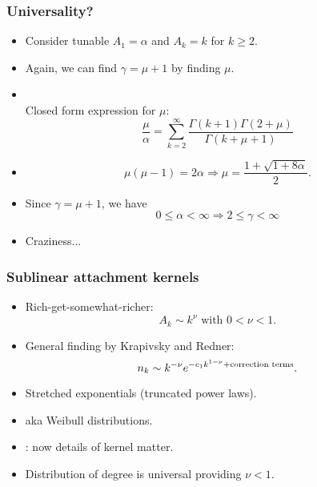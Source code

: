 \begin{frame}
  \frametitle{Universality?}

  \begin{block}{}
    \begin{itemize}
    \item<+->
      Consider tunable $A_{1} = \alpha$ and $A_{k} = k$ for $k \ge 2$.
    \item<+-> 
      Again, we can find $\gamma = \mu + 1$ by finding $\mu$.
    \item<+->
      \\
      Closed form expression for $\mu$: 
      $$
      \frac{\mu}{\alpha}
      =
      \sum_{k=2}^{\infty} 
      \frac{\Gamma(k+1)\Gamma(2+\mu)}{\Gamma(k+\mu+1)}
      $$
    \item<+->
      $$
      \mu(\mu-1) = 2\alpha \Rightarrow \mu = \frac{1+\sqrt{1+8\alpha}}{2}.
      $$
    \item<+-> 
      Since $\gamma = \mu+1$, we have
      $$
      0 \le \alpha < \infty \Rightarrow 2 \le \gamma < \infty
      $$
    \item<+-> 
      Craziness...    
    \end{itemize}
  \end{block}

\end{frame}


\begin{frame}
  \frametitle{Sublinear attachment kernels}

  \begin{block}{}
  \begin{itemize}
  \item<1-> 
    Rich-get-somewhat-richer:
    $$
    A_k \sim k^\nu
    \mbox{\ with $0 < \nu < 1$.}
    $$
  \item<2->
    General finding by Krapivsky and Redner:\cite{krapivsky2001a}
    $$
    n_k 
    \sim 
    k^{-\nu}
    e^{-c_1 k^{1-\nu} + \mbox{\scriptsize correction terms}}.
    $$
  \item<3->
    Stretched exponentials (truncated power laws).
  \item<4->
    aka Weibull distributions.
  \item<5->
    : now details of kernel  matter.
  \item<6->
    Distribution of degree is universal providing $\nu<1$.
  \end{itemize}
  \end{block}

\end{frame}

